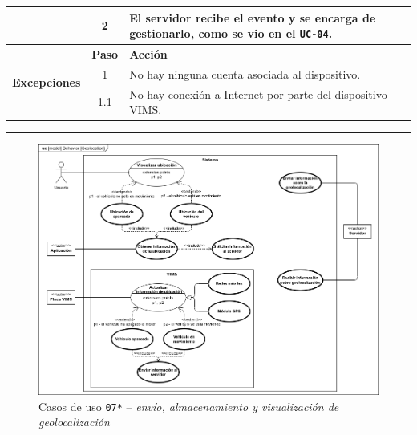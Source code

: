 \begin{table}[H]
\begin{tabularx}{\textwidth}{|c|c|X|}
    \cline{2-3}
                                                & 2                                                                                                                                                 & \multicolumn{1}{L|}{El servidor recibe el evento y se encarga de gestionarlo, como se vio en el \texttt{UC-04}.}                                                        \\
    \hline
    \multirow{3}{*}{\textbf{Excepciones}}       & \textbf{Paso}                                                                                                                                     & \textbf{Acción}                                                                                                                                                         \\
    \cline{2-3}
                                                & 1                                                                                                                                                 & \multicolumn{1}{L|}{No hay ninguna cuenta asociada al dispositivo.}                                                                                                     \\
    \cline{2-3}
                                                & 1.1                                                                                                                                               & \multicolumn{1}{L|}{No hay conexión a Internet por parte del dispositivo \ac{VIMS}.}                                                                                    \\
    \hline
  \end{tabularx}
\end{table}

\noindent\rule{\linewidth}{.2pt}

\begin{figure}[H]
  \centering
  \includegraphics[width=\linewidth]{diagrams/UseCases-UC7 - location.png}
  \caption{Casos de uso \texttt{07*} -- \textit{envío, almacenamiento y visualización de geolocalización}}
  \label{uc:location}
\end{figure}

